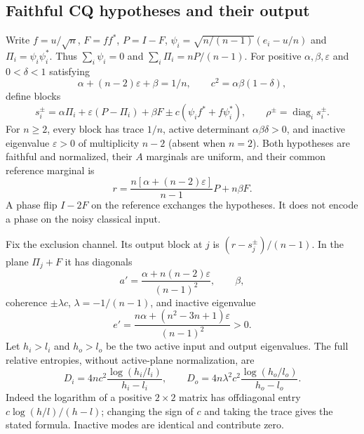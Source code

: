 \documentclass[11pt]{article}
\theoremstyle{remark}\newtheorem{remark}[theorem]{Remark}
\newcommand{\diag}{\operatorname{diag}}
\newcommand{\eps}{\varepsilon}
\begin{document}
\subsection{Faithful CQ hypotheses and their output}
Write $f=u/\sqrt n$, $F=ff^*$, $P=I-F$,
$\psi_i=\sqrt{n/(n-1)}(e_i-u/n)$ and $\Pi_i=\psi_i\psi_i^*$. Thus $\sum_i\psi_i=0$ and $\sum_i\Pi_i=nP/(n-1)$. For positive $\alpha,\beta,\eps$ and $0<\delta<1$ satisfying
\[
 \alpha+(n-2)\eps+\beta=1/n,
 \qquad c^2=\alpha\beta(1-\delta),
\]
define blocks
\begin{equation}\label{eq:blocks}
 s_i^\pm=\alpha\Pi_i+\eps(P-\Pi_i)+\beta F
 \pm c(\psi_if^*+f\psi_i^*),\qquad \rho^\pm=\diag_i s_i^\pm.
\end{equation}
For $n\geq2$, every block has trace $1/n$, active determinant $\alpha\beta\delta>0$, and inactive eigenvalue $\eps>0$ of multiplicity $n-2$ (absent when $n=2$). Both hypotheses are faithful and normalized, their $A$ marginals are uniform, and their common reference marginal is
\[
 r=\frac{n[\alpha+(n-2)\eps]}{n-1}P+n\beta F.
\]
A phase flip $I-2F$ on the reference exchanges the hypotheses. It does not encode a phase on the noisy classical input.

Fix the exclusion channel. Its output block at $j$ is $(r-s_j^\pm)/(n-1)$. In the plane $\Pi_j+F$ it has diagonals
\[
 a'=\frac{\alpha+n(n-2)\eps}{(n-1)^2},\qquad\beta,
\]
coherence $\pm\lambda c$, $\lambda=-1/(n-1)$, and inactive eigenvalue
\[
 e'=\frac{n\alpha+(n^2-3n+1)\eps}{(n-1)^2}>0.
\]
Let $h_i>l_i$ and $h_o>l_o$ be the two active input and output eigenvalues. The full relative entropies, without active-plane normalization, are
\begin{equation}\label{eq:finiteD}
 D_i=4nc^2\frac{\log(h_i/l_i)}{h_i-l_i},\qquad
 D_o=4n\lambda^2c^2\frac{\log(h_o/l_o)}{h_o-l_o}.
\end{equation}
Indeed the logarithm of a positive $2\times2$ matrix has offdiagonal entry $c\log(h/l)/(h-l)$; changing the sign of $c$ and taking the trace gives the stated formula. Inactive modes are identical and contribute zero.
\end{document}

